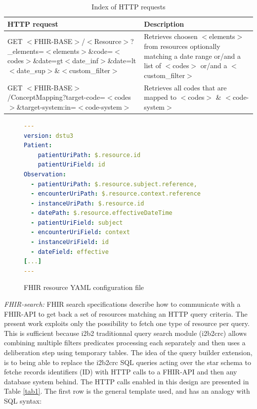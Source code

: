 \documentclass{amia}
\begin{document}
\begin{table}[h]
\centering
	\begin{tabular}{|p{6cm}|p{10cm}|}
  \hline
    \textbf{HTTP request}    & \textbf{Description}  \\ \hline
		GET $<$FHIR-BASE$>$/$<$Resource$>$\newline?\_elements=$<$elements$>$\&code=$<$codes$>$\newline\&date=gt$<$date\_inf$>$\&date=lt$<$date\_sup$>$\newline\&$<$custom\_filter$>$  & Retrieves choosen $<$elements$>$ from resources optionally matching a date range or/and a list of $<$codes$>$  or/and a $<$custom\_filter$>$     \\ \hline
	 GET $<$FHIR-BASE$>$/ConceptMapping\newline?target-code=$<$codes$>$\&target-system:in=$<$code-system$>$  & Retrieves all codes that are mapped to $<$codes$>$ \& $<$code-system$>$   \\ \hline
  \end{tabular}
	\label{tab2}
\caption{Index of HTTP requests}
\end{table}
\begin{figure}
\begin{lstlisting}[language=yaml]
---
version: dstu3
Patient:
    patientUriPath: $.resource.id
    patientUriField: id
Observation:
  - patientUriPath: $.resource.subject.reference,
  - encounterUriPath: $.resource.context.reference
  - instanceUriPath: $.resource.id
  - datePath: $.resource.effectiveDateTime
  - patientUriField: subject
  - encounterUriField: context
  - instanceUriField: id
  - dateField: effective
[...]
---
\end{lstlisting}
  \caption{FHIR resource YAML configuration file}
	\label{conf1}
\end{figure}
\textit{FHIR-search:} FHIR search specifications describe how to communicate with a FHIR-API to get back a set of resources matching an HTTP query criteria. The present work exploits only the possibility to fetch one type of resource per query. This is sufficient because i2b2 traditionnal query search module (i2b2crc) allows combining multiple filters predicates processing each separately and then uses a deliberation step using temporary tables. The idea of the query builder extension, is to being able to replace the i2b2crc SQL queries acting over the star schema to fetche records identifiers (ID) with HTTP calls to a FHIR-API and then any database system behind. The HTTP calls enabled in this design are presented in Table \ref{tab1}. The first row is the general template used, and has an analogy with SQL syntax:
\end{document}
